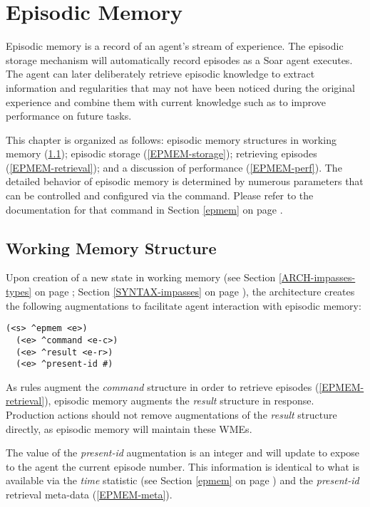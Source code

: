 \chapter{Episodic Memory}
\label{EPMEM}

Episodic memory is a record of an agent's stream of experience. 
The episodic storage mechanism will automatically record episodes as a Soar agent executes. 
The agent can later deliberately retrieve episodic knowledge to extract information and regularities that may not have been noticed during the original experience and combine them with current knowledge such as to improve performance on future tasks.

This chapter is organized as follows: episodic memory structures in working memory (\ref{EPMEM-wm}); episodic storage (\ref{EPMEM-storage}); retrieving episodes (\ref{EPMEM-retrieval}); and a discussion of performance (\ref{EPMEM-perf}). 
The detailed behavior of episodic memory is determined by numerous parameters that can be controlled and configured via the  command. 
Please refer to the documentation for that command in Section \ref{epmem} on page \pageref{epmem}.

\section{Working Memory Structure}
\label{EPMEM-wm}

Upon creation of a new state in working memory (see Section \ref{ARCH-impasses-types} on page \pageref{ARCH-impasses-types}; Section \ref{SYNTAX-impasses} on page \pageref{SYNTAX-impasses}), the architecture creates the following augmentations to facilitate agent interaction with episodic memory:

\begin{verbatim}
(<s> ^epmem <e>)
  (<e> ^command <e-c>)
  (<e> ^result <e-r>)
  (<e> ^present-id #)
\end{verbatim}

As rules augment the \emph{command} structure in order to retrieve episodes (\ref{EPMEM-retrieval}), episodic memory augments the \emph{result} structure in response.
Production actions should not remove augmentations of the \emph{result} structure directly, as episodic memory will maintain these WMEs.

The value of the \emph{present-id} augmentation is an integer and will update to expose to the agent the current episode number.
This information is identical to what is available via the \emph{time} statistic (see Section \ref{epmem} on page \pageref{epmem}) and the \emph{present-id} retrieval meta-data (\ref{EPMEM-meta}).

